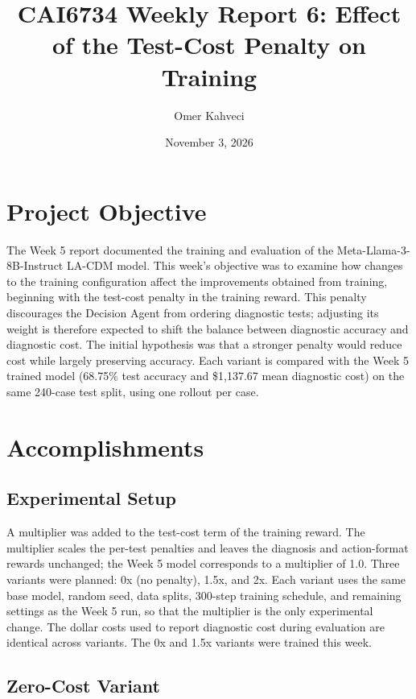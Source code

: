 \documentclass[11pt]{article}
\title{CAI6734 Weekly Report 6: Effect of the Test-Cost Penalty on Training}
\author{Omer Kahveci}
\date{November 3, 2026}
\begin{document}
\maketitle

\section{Project Objective}

The Week 5 report documented the training and evaluation of the
Meta-Llama-3-8B-Instruct LA-CDM model. This week's objective was to examine
how changes to the training configuration affect the improvements obtained
from training, beginning with the test-cost penalty in the training reward.
This penalty discourages the Decision Agent from ordering diagnostic tests;
adjusting its weight is therefore expected to shift the balance between
diagnostic accuracy and diagnostic cost. The initial hypothesis was that a
stronger penalty would reduce cost while largely preserving accuracy. Each
variant is compared with the Week 5 trained model (68.75\% test accuracy and
\$1,137.67 mean diagnostic cost) on the same 240-case test split, using one
rollout per case.

\section{Accomplishments}

\subsection*{Experimental Setup}

A multiplier was added to the test-cost term of the training reward. The
multiplier scales the per-test penalties and leaves the diagnosis and
action-format rewards unchanged; the Week 5 model corresponds to a multiplier
of 1.0. Three variants were planned: 0x (no penalty), 1.5x, and 2x. Each
variant uses the same base model, random seed, data splits, 300-step training
schedule, and remaining settings as the Week 5 run, so that the multiplier is
the only experimental change. The dollar costs used to report diagnostic cost
during evaluation are identical across variants. The 0x and 1.5x variants were
trained this week.

\subsection*{Zero-Cost Variant}
\end{document}
